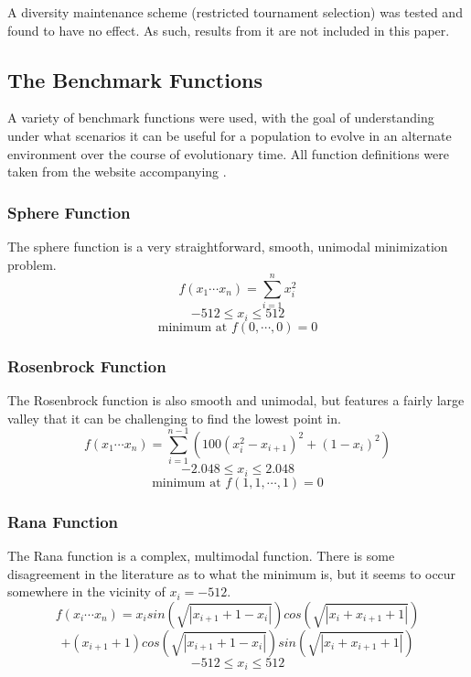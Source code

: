 \documentclass{sig-alternate}
\begin{document}
A diversity maintenance scheme (restricted tournament selection) was tested and found to have no effect. As such, results from it are not included in this paper.

\subsection{The Benchmark Functions}
A variety of benchmark functions were used, with the goal of understanding under what scenarios it can be useful for a population to evolve in an alternate environment over the course of evolutionary time. All function definitions were taken from the website accompanying \cite{holtschulte_should_2013}.

\subsubsection{Sphere Function}
The sphere function is a very straightforward, smooth, unimodal minimization problem.
\begin{displaymath}f(x_1 \cdots x_n) = \sum_{i=1}^n x_i^2\end{displaymath}
\begin{displaymath}-512 \leq x_i \leq 512\end{displaymath}
\begin{displaymath}\text{minimum at }f(0, \cdots, 0) = 0\end{displaymath}

\subsubsection{Rosenbrock Function}
The Rosenbrock function is also smooth and unimodal, but features a fairly large valley that it can be challenging to find the lowest point in.
\begin{displaymath}f(x_1 \cdots x_n) = \sum_{i=1}^{n-1} (100(x_i^2 - x_{i+1})^2 + (1-x_i)^2)\end{displaymath}
\begin{displaymath}-2.048 \leq x_i \leq 2.048\end{displaymath}
\begin{displaymath}\text{minimum at }f(1, 1, \cdots, 1) = 0\end{displaymath}

\subsubsection{Rana Function}
The Rana function is a complex, multimodal function. There is some disagreement in the literature as to what the minimum is, but it seems to occur somewhere in the vicinity of $x_i = -512$. 
\begin{displaymath}f(x_i \cdots x_n)=x_i sin(\sqrt{|x_{i+1}+1-x_i|})cos(\sqrt{|x_i+x_{i+1}+1|})\end{displaymath}
\begin{displaymath} + (x_{i+1}+1)cos(\sqrt{|x_{i+1}+1-x_i|})sin(\sqrt{|x_i+x_{i+1}+1|})\end{displaymath}
\begin{displaymath}-512 \leq x_i \leq 512\end{displaymath}
\end{document}
